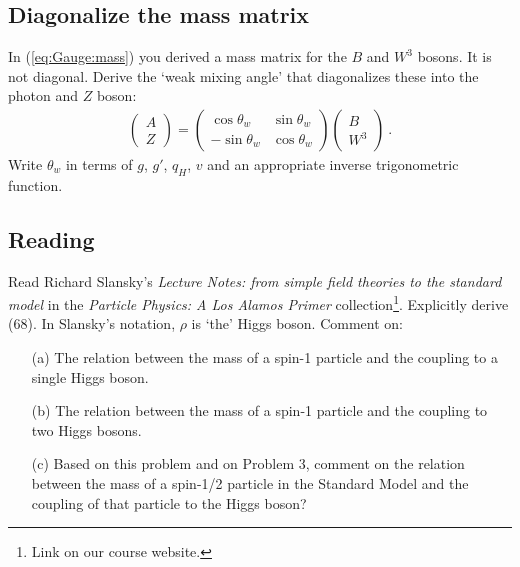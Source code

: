 \documentclass[12pt]{article}
\begin{document}
\subsection{Diagonalize the mass matrix}
In (\ref{eq:Gauge:mass}) you derived a mass matrix for the $B$ and $W^3$ bosons. It is not diagonal. Derive the `weak mixing angle' that diagonalizes these into the photon and $Z$ boson:
\begin{align}
	\begin{pmatrix}
		A \\
		Z
	\end{pmatrix}
	=
	\begin{pmatrix}
		\cos\theta_w & \sin\theta_w\\
		-\sin\theta_w & \cos\theta_w
	\end{pmatrix}
	\begin{pmatrix}
		B \\
		W^3
	\end{pmatrix} \ .
\end{align}
Write $\theta_w$ in terms of $g$, $g'$, $q_H$, $v$ and an appropriate inverse trigonometric function.


\subsection{Reading}

Read Richard Slansky's \emph{Lecture Notes: from simple field theories to the standard model} in the \textit{Particle Physics: A Los Alamos Primer} collection\footnote{Link on our course website.}. Explicitly derive (68). In Slansky's notation, $\rho$ is `the' Higgs boson. Comment on:
\begin{itemize}
\item[(a)] The relation between the mass of a spin-1 particle and the coupling to a single Higgs boson.
\item[(b)] The relation between the mass of a spin-1 particle and the coupling to two Higgs bosons.
\item[(c)] Based on this problem and on Problem 3, comment on the relation between the mass of a spin-1/2 particle in the Standard Model and the coupling of that particle to the Higgs boson?
\end{itemize}
\end{document}
